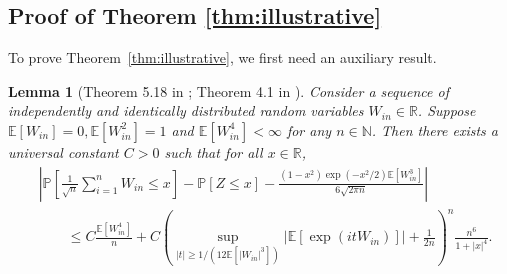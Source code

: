 \documentclass[12pt]{article}
\newtheorem{lemma}{Lemma}
\theoremstyle{definition}
\def\P{\mathbb{P}}
\def\P{\mathbb{P}}
\newcommand{\E}{\mathbb E}								%
\renewcommand{\P}{\mathbb{P}}							%
\begin{document}
\subsection{Proof of Theorem \ref{thm:illustrative}}


To prove Theorem~\ref{thm:illustrative}, we first need an auxiliary result. 
\begin{lemma}[Theorem 5.18 in \citep{Petrov1995}; Theorem 4.1 in \citep{Kuchibhotla2023}]\label{lem:asymptotic-expansion}
	Consider a sequence of independently and identically distributed random variables $W_{in}\in\mathbb{R}$. Suppose  $\E[W_{in}]=0,\E[W_{in}^2]=1$ and $\E[W_{in}^4]<\infty$ for any $n\in\mathbb{N}$. Then there exists a universal constant $C>0$ such that for all $x\in\mathbb{R}$,
	\begin{align}
		&\nonumber
		\left|\P\left[\frac{1}{\sqrt{n}}\sum_{i=1}^n W_{in}\leq x\right]-\P[Z\leq x]-\frac{(1-x^2)\exp(-x^2/2)\E[W_{in}^3]}{6\sqrt{2\pi n}}\right|\\
		&\label{eq:asymptotic-expansion-UB}
		\qquad\leq C\frac{\E[W_{in}^4]}{n}+C\left(\sup_{|t|\geq 1/ (12\E[|W_{in}|^3])}|\E[\exp(itW_{in})]|+\frac{1}{2n}\right)^n\frac{n^6}{1+|x|^4}.
	\end{align}
\end{lemma}
\end{document}
